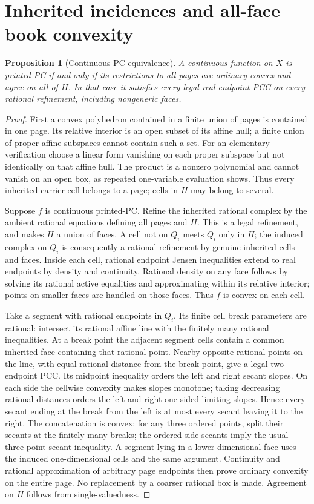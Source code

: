 \documentclass[11pt]{article}
\newtheorem{proposition}[theorem]{Proposition}
\theoremstyle{definition}\newtheorem{definition}[theorem]{Definition}
\theoremstyle{remark}\newtheorem{remark}[theorem]{Remark}
\begin{document}
\section{Inherited incidences and all-face book convexity}
\begin{proposition}[Continuous PC equivalence]\label{book}
A continuous function on $X$ is printed-PC if and only if its restrictions to all pages are ordinary convex and agree on all of $H$. In that case it satisfies every legal real-endpoint PCC on every rational refinement, including nongeneric faces.
\end{proposition}
\begin{proof}
First a convex polyhedron contained in a finite union of pages is contained in one page. Its relative interior is an open subset of its affine hull; a finite union of proper affine subspaces cannot contain such a set. For an elementary verification choose a linear form vanishing on each proper subspace but not identically on that affine hull. The product is a nonzero polynomial and cannot vanish on an open box, as repeated one-variable evaluation shows. Thus every inherited carrier cell belongs to a page; cells in $H$ may belong to several.

Suppose $f$ is continuous printed-PC. Refine the inherited rational complex by the ambient rational equations defining all pages and $H$. This is a legal refinement, and makes $H$ a union of faces. A cell not on $Q_i$ meets $Q_i$ only in $H$; the induced complex on $Q_i$ is consequently a rational refinement by genuine inherited cells and faces. Inside each cell, rational endpoint Jensen inequalities extend to real endpoints by density and continuity. Rational density on any face follows by solving its rational active equalities and approximating within its relative interior; points on smaller faces are handled on those faces. Thus $f$ is convex on each cell.

Take a segment with rational endpoints in $Q_i$. Its finite cell break parameters are rational: intersect its rational affine line with the finitely many rational inequalities. At a break point the adjacent segment cells contain a common inherited face containing that rational point. Nearby opposite rational points on the line, with equal rational distance from the break point, give a legal two-endpoint PCC. Its midpoint inequality orders the left and right secant slopes. On each side the cellwise convexity makes slopes monotone; taking decreasing rational distances orders the left and right one-sided limiting slopes. Hence every secant ending at the break from the left is at most every secant leaving it to the right. The concatenation is convex: for any three ordered points, split their secants at the finitely many breaks; the ordered side secants imply the usual three-point secant inequality. A segment lying in a lower-dimensional face uses the induced one-dimensional cells and the same argument. Continuity and rational approximation of arbitrary page endpoints then prove ordinary convexity on the entire page. No replacement by a coarser rational box is made. Agreement on $H$ follows from single-valuedness.


\end{proof}
\end{document}
